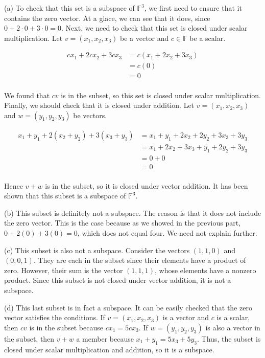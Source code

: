 \documentclass{zupan}
\begin{document}
\begin{solution}
  (a) To check that this set is a subspace of $\mathbb{F}^3$, we first need to
  ensure that it contains the zero vector. At a glace, we can see that it does,
  since $0 + 2 \cdot 0 + 3 \cdot 0 = 0$. Next, we need to check that this set
  is closed under scalar multiplication. Let $v = (x_1, x_2, x_3)$ be a vector
  and $c \in \mathbb{F}$ be a scalar.

  \[
    \begin{aligned}
      cx_1 + 2cx_2 + 3cx_3
        & = c(x_1 + 2x_2 + 3x_3) \\
        & = c(0) \\
        & = 0 \\
    \end{aligned}
  \]

  We found that $cv$ is in the subset, so this set is closed under scalar
  multiplication. Finally, we should check that it is closed under addition.
  Let $v = (x_1, x_2, x_3)$ and $w = (y_1, y_2, y_3)$ be vectors.

  \[
    \begin{aligned}
      x_1 + y_1 + 2(x_2 + y_2) + 3(x_3 + y_3)
        & = x_1 + y_1 + 2x_2 + 2y_2 + 3x_3 + 3y_3 \\
        & = x_1 + 2x_2 + 3x_3 + y_1 + 2y_2 + 3y_3 \\
        & = 0 + 0 \\
        & = 0 \\
    \end{aligned}
  \]

  Hence $v + w$ is in the subset, so it is closed under vector addition. It has
  been shown that this subset is a subspace of $\mathbb{F}^3$.

  (b) This subset is definitely not a subspace. The reason is that it does not
  include the zero vector. This is the case because as we showed in the
  previous part, $0 + 2(0) + 3(0) = 0$, which does not equal four. We need not
  explain further.

  (c) This subset is also not a subspace. Consider the vectors $(1, 1, 0)$ and
  $(0, 0, 1)$. They are each in the subset since their elements have a product
  of zero. However, their sum is the vector $(1, 1, 1)$, whose elements have a
  nonzero product. Since this subset is not closed under vector addition, it is
  not a subspace.

  (d) This last subset is in fact a subspace. It can be easily checked that the
  zero vector satisfies the conditions. If $v = (x_1, x_2, x_3)$ is a vector
  and $c$ is a scalar, then $cv$ is in the subset because $cx_1 = 5cx_3$. If $w
  = (y_1, y_2, y_3)$ is also a vector in the subset, then $v + w$ a member
  because $x_1 + y_1 = 5x_3 + 5y_3$. Thus, the subset is closed under scalar
  multiplication and addition, so it is a subspace.
\end{solution}
\end{document}
